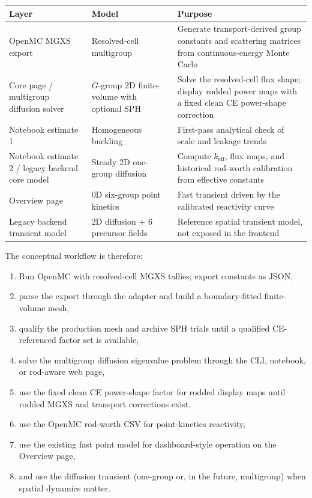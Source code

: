 \documentclass[11pt]{article}
\begin{document}
\begin{center}
\begin{tabular}{p{3.2cm}p{4.0cm}p{5.3cm}}
\toprule
Layer & Model & Purpose \\
\midrule
OpenMC MGXS export & Resolved-cell multigroup & Generate transport-derived group constants and scattering matrices from continuous-energy Monte Carlo \\
\rule{0pt}{13pt}%
Core page / multigroup diffusion solver & $G$-group 2D finite-volume with optional SPH & Solve the resolved-cell flux shape; display rodded power maps with a fixed clean CE power-shape correction \\
Notebook estimate 1 & Homogeneous buckling & First-pass analytical check of scale and leakage trends \\
Notebook estimate 2 / legacy backend core model & Steady 2D one-group diffusion & Compute $k_{\mathrm{eff}}$, flux maps, and historical rod-worth calibration from effective constants \\
Overview page & 0D six-group point kinetics & Fast transient driven by the calibrated reactivity curve \\
Legacy backend transient model & 2D diffusion + 6 precursor fields & Reference spatial transient model, not exposed in the frontend \\
\bottomrule
\end{tabular}
\end{center}

The conceptual workflow is therefore:
\begin{enumerate}
  \item Run OpenMC with resolved-cell MGXS tallies; export constants as JSON,
  \item parse the export through the adapter and build a boundary-fitted
        finite-volume mesh,
  \item qualify the production mesh and archive SPH trials until a qualified
        CE-referenced factor set is available,
  \item solve the multigroup diffusion eigenvalue problem through the CLI,
        notebook, or rod-aware web page,
  \item use the fixed clean CE power-shape factor for rodded display maps
        until rodded MGXS and transport corrections exist,
  \item use the OpenMC rod-worth CSV for point-kinetics reactivity,
  \item use the existing fast point model for dashboard-style operation on the
        Overview page,
  \item and use the diffusion transient (one-group or, in the future,
        multigroup) when spatial dynamics matter.
\end{enumerate}
\end{document}
